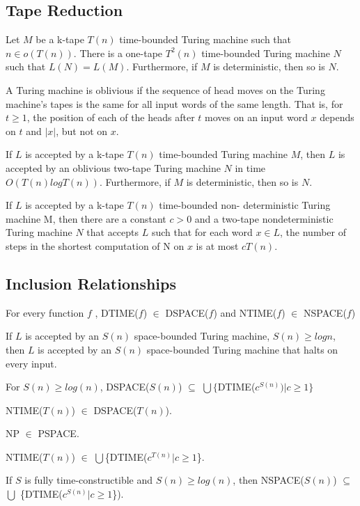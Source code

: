 \subsection{Tape Reduction}

 Let $M$ be a k-tape $T(n)$ time-bounded Turing machine
such that $n \in o(T(n))$. There is a one-tape $T^2(n)$ time-bounded
Turing machine
$N$ such that $L(N) = L(M)$. Furthermore, if $M$ is deterministic, then so is
$N$.

A Turing machine is oblivious if the sequence of head moves on
the
Turing machine's tapes is the same for all input words of the same
length. That is,
for $t \ge 1$, the position of each of the heads after $t$ moves on an
input word $x$ depends on $t$ and $|x|$, but not on $x$.

 If $L$ is accepted by a k-tape $T(n)$ time-bounded
Turing machine $M$, then $L$ is accepted by an oblivious two-tape Turing machine
$N$ in time $O(T(n)logT(n))$. Furthermore, if $M$ is deterministic, then so is
$N$.

 If $L$ is accepted by a k-tape $T(n)$ time-bounded non-
deterministic Turing machine M, then there are a constant $c > 0$ and a two-tape
nondeterministic Turing machine $N$ that accepts $L$ such that for each word
$x \in L$,
the number of steps in the shortest computation of N on $x$ is at most $cT(n)$.

\subsection{Inclusion Relationships}

 For every function $f$ ,
DTIME($f$) $\in$ DSPACE($f$) and NTIME($f$) $\in$ NSPACE($f$)

 If $L$ is accepted by an $S(n)$ space-bounded Turing machine, 
$S(n) \ge log n$, then $L$ is accepted by an $S(n)$ space-bounded
Turing machine that halts on every input.

 For $S(n) \ge log(n)$,
DSPACE($S(n)$) $\subseteq$ $\bigcup \{$DTIME($c^{S(n)}) | c \ge 1 \}$

  NTIME($T(n)$) $\in$ DSPACE($T(n)$).

 NP $\in$ PSPACE.

 NTIME($T(n)$) $\in$ $\bigcup$\{DTIME($c^{T(n)}| c \ge 1$\}.

 If $S$ is fully time-constructible and $S(n) \ge
log(n)$, then NSPACE($S(n)$) $\subseteq$ $\bigcup$ \{DTIME($c^{S(n)}|c \ge 1$\}).

